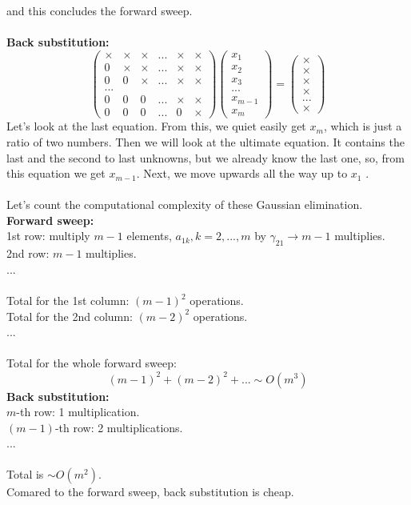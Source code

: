 \documentclass{article}
\begin{document}
and this concludes the forward sweep.\\
\\{\bf Back substitution:}
\[
\begin{pmatrix}
    \times & \times & \times & ... & \times & \times\\
    0 & \times & \times & ... & \times & \times\\
    0 & 0 & \times & ... & \times & \times\\
    ...\\
    0 & 0 & 0 & ... & \times & \times\\
    0 & 0 & 0 & ... & 0 & \times
\end{pmatrix}
\begin{pmatrix}
    x_1\\
    x_2\\
    x_3\\
    ...\\
    x_{m-1}\\
    x_m
\end{pmatrix}
=
\begin{pmatrix}
    \times\\
    \times\\
    \times\\
    \times\\
    ...\\
    \times
\end{pmatrix}
\]
Let's look at the last equation. From this, we quiet easily get $x_m$, which is just a ratio of two numbers. Then we will look at the ultimate equation. It contains the last and the second to last unknowns, but we already know the last one, so, from this equation we get $x_{m-1}$. Next, we move upwards all the way up to $x_1$ .\\
\\Let's count the computational complexity of these Gaussian elimination.
\\{\bf Forward sweep:}
\\1st row: multiply $m-1$ elements, $a_{1k}, k=2,...,m$ by $\gamma_{21} \to m-1$ multiplies.
\\2nd row: $m-1$ multiplies.
\\...
\\\\Total for the 1st column: $(m-1)^2$ operations.
\\Total for the 2nd column: $(m-2)^2$ operations.
\\...
\\\\Total for the whole forward sweep:
\[
(m-1)^2 + (m-2)^2 + ... \sim O(m^3)
\]
{\bf Back substitution:}
\\$m$-th row: 1 multiplication.
\\$(m-1)$-th row: 2 multiplications.
\\...
\\\\Total is $\sim O(m^2)$.
\\Comared to the forward sweep, back substitution is cheap.
\end{document}
